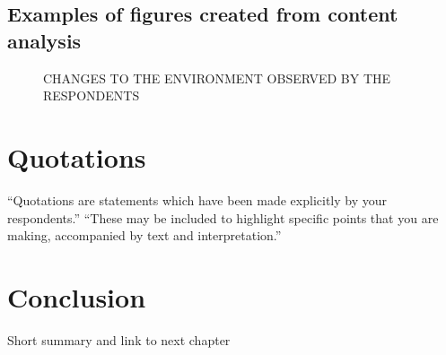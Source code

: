 \subsection{Examples of figures created from content analysis}
 
 \begin{figure}[!htb]
        \caption{\label{fig:my-label} CHANGES TO THE ENVIRONMENT OBSERVED BY THE RESPONDENTS}
\end{figure}    


\section{Quotations}

“Quotations are statements which have been made explicitly by your respondents.”
“These may be included to highlight specific points that you are making, accompanied by text and interpretation.”

\section{Conclusion}
\label{sec:conclucionchapter4}
Short summary and link to next chapter


